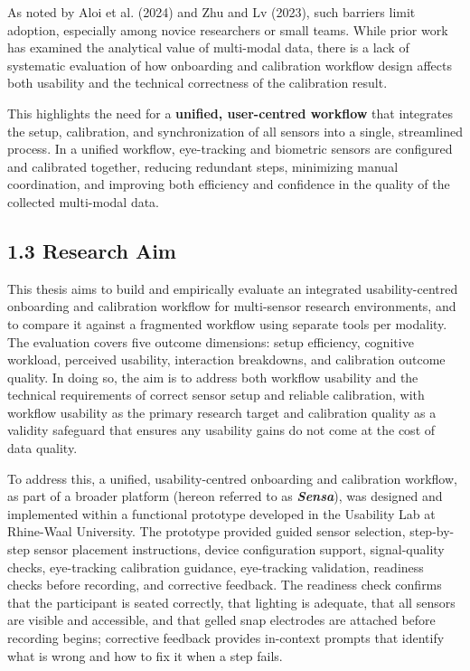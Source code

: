 \documentclass[
]{article}
\begin{document}
As noted by Aloi et al. (2024) and Zhu and Lv (2023), such barriers limit adoption, especially among novice researchers or small teams. While prior work has examined the analytical value of multi-modal data, there is a lack of systematic evaluation of how onboarding and calibration workflow design affects both usability and the technical correctness of the calibration result.

This highlights the need for a \textbf{unified, user-centred workflow} that integrates the setup, calibration, and synchronization of all sensors into a single, streamlined process. In a unified workflow, eye-tracking and biometric sensors are configured and calibrated together, reducing redundant steps, minimizing manual coordination, and improving both efficiency and confidence in the quality of the collected multi-modal data.

\hypertarget{research-aim}{%
\subsection{1.3 Research Aim}\label{research-aim}}

This thesis aims to build and empirically evaluate an integrated usability-centred onboarding and calibration workflow for multi-sensor research environments, and to compare it against a fragmented workflow using separate tools per modality. The evaluation covers five outcome dimensions: setup efficiency, cognitive workload, perceived usability, interaction breakdowns, and calibration outcome quality. In doing so, the aim is to address both workflow usability and the technical requirements of correct sensor setup and reliable calibration, with workflow usability as the primary research target and calibration quality as a validity safeguard that ensures any usability gains do not come at the cost of data quality.

To address this, a unified, usability-centred onboarding and calibration workflow, as part of a broader platform (hereon referred to as \emph{\textbf{Sensa}}), was designed and implemented within a functional prototype developed in the Usability Lab at Rhine-Waal University. The prototype provided guided sensor selection, step-by-step sensor placement instructions, device configuration support, signal-quality checks, eye-tracking calibration guidance, eye-tracking validation, readiness checks before recording, and corrective feedback. The readiness check confirms that the participant is seated correctly, that lighting is adequate, that all sensors are visible and accessible, and that gelled snap electrodes are attached before recording begins; corrective feedback provides in-context prompts that identify what is wrong and how to fix it when a step fails.
\end{document}
